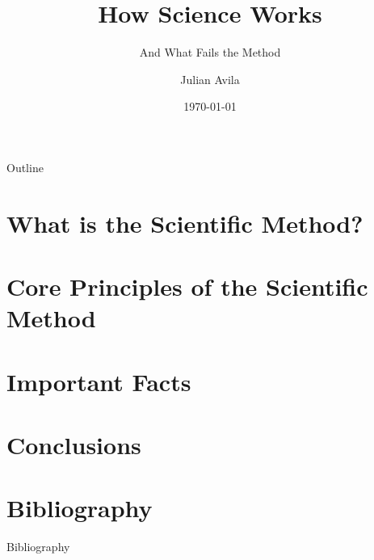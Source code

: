 \documentclass[pdflatex, sn-mathphys-num]{beamer}
\title{How Science Works}
\subtitle{And What Fails the Method}
\author{Julian Avila}
\institute{Universidad Distrital Francisco José de Caldas}
\date{\today}
\begin{document}
\begin{frame}
	\titlepage
\end{frame}

\begin{frame}{Outline}
	\tableofcontents
\end{frame}

\section{What is the Scientific Method?}


\section{Core Principles of the Scientific Method}


\section{Important Facts}


\section{Conclusions}


\section{Bibliography}
\begin{frame}[allowframebreaks]{Bibliography}
	\footnotesize
	\printbibliography
\end{frame}
\end{document}
